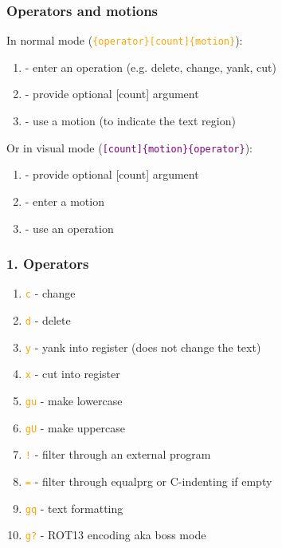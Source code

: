 \documentclass{beamer}
\newcommand{\vimnormal}[1]{\texttt{\textcolor{orange}{#1}}}
\newcommand{\vimvisual}[1]{\texttt{\textcolor{purple}{#1}}}
\newcommand{\vimoperator}[1]{\texttt{\textcolor{orange}{#1}}}
\begin{document}
\begin{frame}
    \frametitle{Operators and motions}
    In normal mode (\vimnormal{\{operator\}[count]\{motion\}}):
    \begin{enumerate}
        \item - enter an operation (e.g. delete, change, yank, cut)
        \item - provide optional [count] argument
        \item - use a motion (to indicate the text region)
    \end{enumerate}
    Or in visual mode (\vimvisual{[count]\{motion\}\{operator\}}):
    \begin{enumerate}
        \item - provide optional [count] argument
        \item - enter a motion
        \item - use an operation
    \end{enumerate}
\end{frame}

\begin{frame}
    \frametitle{1. Operators}
    \begin{enumerate}
        \item \vimoperator{c}  - change
        \item \vimoperator{d}  - delete
        \item \vimoperator{y}  - yank into register (does not change the text)
        \item \vimoperator{x}  - cut into register
        \item \vimoperator{gu} - make lowercase
        \item \vimoperator{gU} - make uppercase
        \item \vimoperator{!}  - filter through an external program
        \item \vimoperator{=}  - filter through equalprg or C-indenting if empty
        \item \vimoperator{gq} - text formatting
        \item \vimoperator{g?} - ROT13 encoding aka boss mode
    \end{enumerate}
\end{frame}
\end{document}
